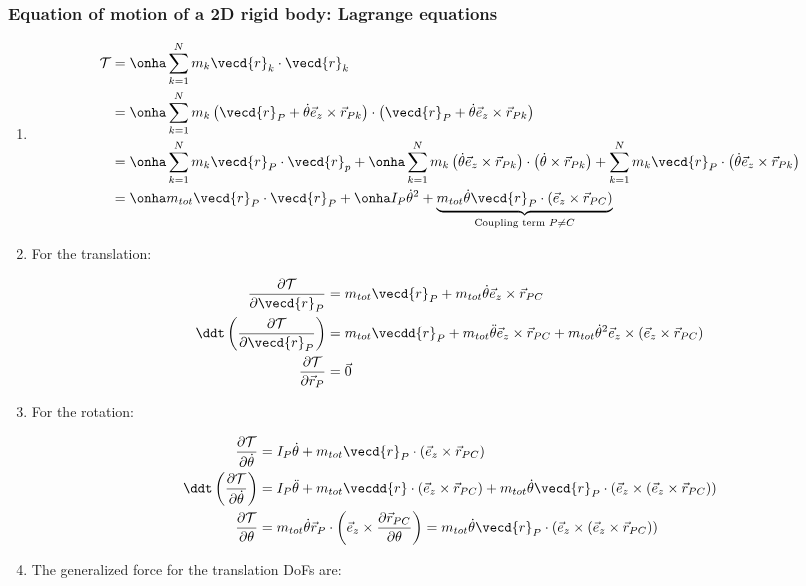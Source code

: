 \documentclass[10pt,a4paper]{scrartcl}
\begin{document}
\begin{multicols*}{2}
\subsubsection{Equation of motion of a 2D rigid body: Lagrange equations}
\begin{enumerate}
\item 

\begin{align*}
\mathcal{T}&=\onha\sum\limits_{k=1}^Nm_k\vecd{r}_k\cdot\vecd{r}_k\\
&=\onha\sum\limits_{k=1}^Nm_k\left(\vecd{r}_P+\dot{\theta}\vec{e}_z\times\vec{r}_{Pk}\right)\cdot\left(\vecd{r}_P+\dot{\theta}\vec{e}_z\times\vec{r}_{Pk}\right)\\
&=\onha\sum\limits_{k=1}^Nm_k\vecd{r}_P\cdot\vecd{r}_p+\onha\sum\limits_{k=1}^Nm_k\left(\dot{\theta}\vec{e}_z\times\vec{r}_{Pk}\right)\cdot\left(\dot{\theta}\times\vec{r}_{Pk}\right)+\sum\limits_{k=1}^Nm_k\vecd{r}_P\cdot\left(\dot{\theta}\vec{e}_z\times\vec{r}_{Pk}\right)\\
&=\onha m_{tot}\vecd{r}_P\cdot\vecd{r}_P+\onha I_P\dot{\theta}^2+\underbrace{m_{tot}\dot{\theta}\vecd{r}_P\cdot\left(\vec{e}_z\times\vec{r}_{PC}\right)}_{\text{Coupling term }P\neq C}
\end{align*}

\item For the translation:

\begin{align*}
\frac{\partial\mathcal{T}}{\partial\vecd{r}_P}&=m_{tot}\vecd{r}_P+m_{tot}\dot{\theta}\vec{e}_z\times\vec{r}_{PC}\\
\ddt\left(\frac{\partial\mathcal{T}}{\partial\vecd{r}_P}\right)&=m_{tot}\vecdd{r}_P+m_{tot}\ddot{\theta}\vec{e}_z\times\vec{r}_{PC}+m_{tot}\dot{\theta}^2\vec{e}_z\times\left(\vec{e}_z\times\vec{r}_{PC}\right)\\
\frac{\partial\mathcal{T}}{\partial\vec{r}_P}&=\vec{0}
\end{align*}
\item For the rotation:

\begin{align*}
\frac{\partial\mathcal{T}}{\partial\dot{\theta}}&=I_P\dot{\theta}+m_{tot}\vecd{r}_P\cdot\left(\vec{e}_z\times\vec{r}_{PC}\right)\\
\ddt\left(\frac{\partial\mathcal{T}}{\partial\dot{\theta}}\right)&=I_P\ddot{\theta}+m_{tot}\vecdd{r}\cdot\left(\vec{e}_z\times\vec{r}_{PC}\right)+m_{tot}\dot{\theta}\vecd{r}_P\cdot\left(\vec{e}_z\times\left(\vec{e}_z\times\vec{r}_{PC}\right)\right)\\
\frac{\partial\mathcal{T}}{\partial\theta}&=m_{tot}\dot{\theta}\vec{r}_P\cdot\left(\vec{e}_z\times\frac{\partial\vec{r}_{PC}}{\partial\theta}\right)=m_{tot}\dot{\theta}\vecd{r}_P\cdot\left(\vec{e}_z\times\left(\vec{e}_z\times\vec{r}_{PC}\right)\right)
\end{align*}
\item The generalized force for the translation DoFs are:


\end{enumerate}
\end{multicols*}
\end{document}
